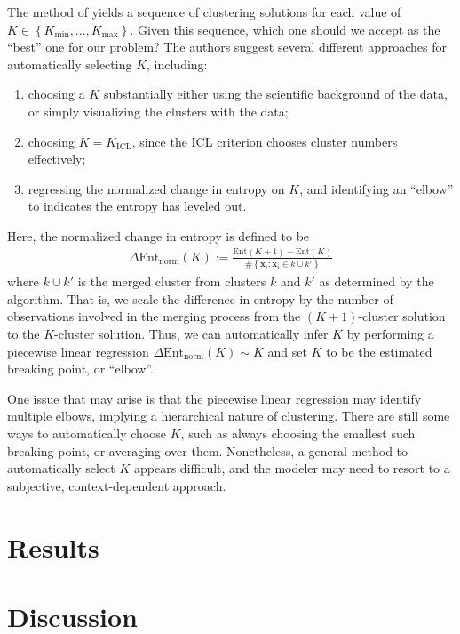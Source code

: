 \documentclass{uwstat572}
\newcommand*\ba{\[ \begin{aligned}}
\newcommand*\ea{\end{aligned} \]}
\newcommand*\set[1]{\left\{#1\right\}}
\newcommand*\bx{\mathbf{x}}
\renewcommand\;{\,}
\begin{document}
The method of \cite{Baudry10} yields a sequence of clustering solutions for each value of $K \in \set{K_\text{min}, \dotsc, K_\text{max}}$.
Given this sequence, which one should we accept as the ``best'' one for our problem?
The authors suggest several different approaches for automatically selecting $K$, including:
\begin{enumerate}
\item
choosing a $K$ substantially either using the scientific background of the data, or simply visualizing the clusters with the data;
\item
choosing $K = K_\text{ICL}$, since the ICL criterion chooses cluster numbers effectively;
\item
regressing the normalized change in entropy on $K$, and identifying an ``elbow'' to indicates the entropy has leveled out.
\end{enumerate}
Here, the normalized change in entropy is defined to be
\ba
\Delta\text{Ent}_\text{norm}(K)
	:= \frac{ \text{Ent}(K + 1) - \text{Ent}(K) }{ \#\set{ \bx_i: \bx_i \in k \cup k' } } 
\ea
where $k\cup k'$ is the merged cluster from clusters $k$ and $k'$ as determined by the algorithm. 
That is, we scale the difference in entropy by the number of observations involved in the merging process from the $(K+1)$-cluster solution to the $K$-cluster solution. 
Thus, we can automatically infer $K$ by performing a piecewise linear regression $\Delta \text{Ent}_\text{norm}(K) \sim K$ and set $K$ to be the estimated breaking point, or ``elbow''.

One issue that may arise is that the piecewise linear regression may identify multiple elbows, implying a hierarchical nature of clustering.
There are still some ways to automatically choose $K$, such as always choosing the smallest such breaking point, or averaging over them.
Nonetheless, a general method to automatically select $K$ appears difficult, and the modeler may need to resort to a subjective, context-dependent approach.


\section{Results}

\section{Discussion}


\end{document}
